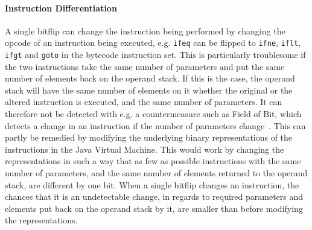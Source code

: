 \paragraph{Instruction Differentiation} 
A single bitflip can change the instruction being performed by changing the opcode of an instruction being executed, e.g. \texttt{ifeq} can be flipped to \texttt{ifne}, \texttt{iflt}, \texttt{ifgt} and \texttt{goto} in the \jc bytecode instruction set. This is particularly troublesome if the two instructions take the same number of parameters and put the same number of elements back on the operand stack. If this is the case, the operand stack will have the same number of elements on it whether the original or the altered instruction is executed, and the same number of parameters. It can therefore not be detected with e.g. a countermeasure such as Field of Bit, which detects a change in an instruction if the number of parameters change~\cite[p. 16]{javasec}.
This can partly be remedied by modifying the underlying binary representations of the instructions in the Java Virtual Machine.
This would work by changing the representations in such a way that as few as possible instructions with the same number of parameters, and the same number of elements returned to the operand stack, are different by one bit. 
When a single bitflip changes an instruction, the chances that it is an undetectable change, in regards to required parameters and elements put back on the operand stack by it, are smaller than before modifying the representations.

